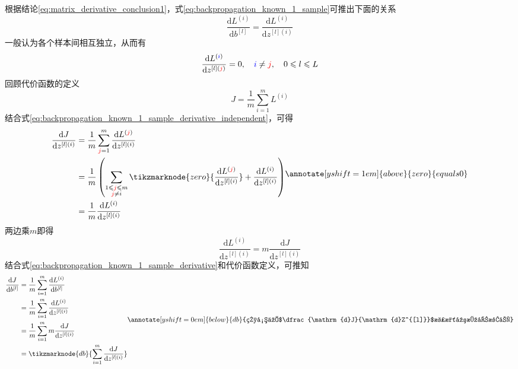 根据结论\eqref{eq:matrix_derivative_conclusion1}，式\eqref{eq:backpropagation_known_1_sample}可推出下面的关系
\begin{equation}
	\frac{\mathrm{d}L^{(i)}}{\mathrm{d}b^{[l]}} = \frac{\mathrm{d}L^{(i)}}{\mathrm{d}z^{[l](i)}}
	\label{eq:backpropagation_known_1_sample_derivative}
\end{equation}
一般认为各个样本间相互独立，从而有
\begin{equation}
	\frac{\mathrm{d}L^{(\textcolor{blue}{i})}}{\mathrm{d}z^{[l](\textcolor{red}{j})}}=0
	, \quad \textcolor{blue}{i} \neq \textcolor{red}{j}, \quad 0 \leqslant l \leqslant L
	\label{eq:backpropagation_known_1_sample_derivative_independent}
\end{equation}
回顾代价函数的定义
\begin{equation}
	J = \frac{1}{m} \sum_{i=1}^{m} L^{(i)}
\end{equation}
结合式\eqref{eq:backpropagation_known_1_sample_derivative_independent}，可得
\begin{equation}
	\begin{aligned}
		\frac{\mathrm{d}J}{\mathrm{d}z^{[l](i)}} 
		&= \frac{1}{m}  \sum_{\textcolor{red}{j}=1}^{m} \frac{\mathrm{d}L^{(\textcolor{red}{j})}}{\mathrm{d}z^{[l](i)}} \\
		&= \frac{1}{m}  \left( \sum_{\substack{1 \leqslant \textcolor{red}{j} \leqslant m \\ \textcolor{red}{j} \neq i}} \tikzmarknode{zero}{\frac{\mathrm{d}L^{(\textcolor{red}{j})}}{\mathrm{d}z^{[l](i)}}} + \frac{\mathrm{d}L^{(i)}}{\mathrm{d}z^{[l](i)}} \right) \\
		&= \frac{1}{m} \frac{\mathrm{d}L^{(i)}}{\mathrm{d}z^{[l](i)}} \\
	\end{aligned}
	\annotate[yshift=1em]{above}{zero}{equals 0}
\end{equation}
两边乘$m$即得
\begin{equation}
	\frac{\mathrm{d}L^{(i)}}{\mathrm{d}z^{[l](i)}} = m \frac{\mathrm{d}J}{\mathrm{d}z^{[l](i)}}
\end{equation}
结合式\eqref{eq:backpropagation_known_1_sample_derivative}和代价函数定义，可推知
\begin{equation}
	\begin{aligned}
		\frac{\mathrm{d}J}{\mathrm{d}b^{[l]}} 
		&= \frac{1}{m} \sum_{i=1}^{m} \frac{\mathrm{d}L^{(i)}}{\mathrm{d}b^{[l]}} \\
		&= \frac{1}{m} \sum_{i=1}^{m} \frac{\mathrm{d}L^{(i)}}{\mathrm{d}z^{[l](i)}} \\
		&= \frac{1}{m} \sum_{i=1}^{m} m \frac{\mathrm{d}J}{\mathrm{d}z^{[l](i)}} \\
		&= \tikzmarknode{db}{\sum_{i=1}^{m} \frac{\mathrm{d}J}{\mathrm{d}z^{[l](i)}}}
	\label{eq:backpropagation_conc_4}
	\end{aligned}
	\vspace{2em}
	\renewcommand{\eqnannotationstrut}{\rule[-0.7\baselineskip]{0pt}{1.5\baselineskip}}
	\annotate[yshift=0em]{below}{db}{相当于$\dfrac{\mathrm{d}J}{\mathrm{d}Z^{[l]}}$沿水平方向求和}
	\renewcommand{\eqnannotationstrut}{\strut} %
\end{equation}
